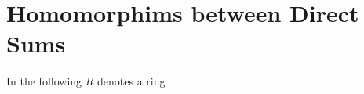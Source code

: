 \section{Homomorphims between Direct Sums}
\label{appendix: homomorphisms between direct sums}


\begin{conventions}
  In the following $R$ denotes a ring
\end{conventions}








